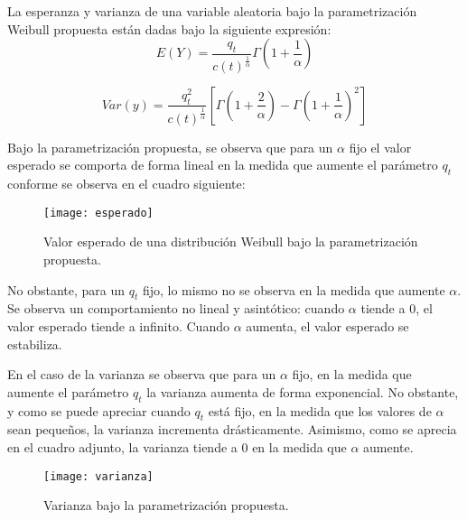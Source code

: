 La esperanza y varianza de una variable aleatoria bajo la parametrización Weibull propuesta están dadas bajo la siguiente expresión:
\begin{equation}
E(Y)=\frac{q_{t}}{c(t)^{\frac{1}{\alpha}}}\Gamma\left( 1+\frac{1}{\alpha} \right)
\end{equation}

\begin{equation}
Var(y)=\frac{q_{t}^{2}}{c(t)^{\frac{1}{\alpha}}}\left[ \Gamma\left( 1+\frac{2}{\alpha}\right)-\Gamma\left( 1+\frac{1}{\alpha} \right)^{2} \right]
\end{equation}

Bajo la parametrización propuesta, se observa que para un $\alpha$ fijo el valor esperado se comporta de forma lineal en la medida que aumente el parámetro $q_{t}$ conforme se observa en el cuadro siguiente:

\begin{figure}[H]
	\texttt{[image: esperado]}
	\caption{Valor esperado de una distribución Weibull bajo la parametrización propuesta.}
\end{figure}
\noindent No obstante, para un $q_{t}$ fijo, lo mismo no se observa en la medida que aumente $\alpha$. Se observa un comportamiento no lineal y asintótico: cuando $\alpha$ tiende a 0, el valor esperado tiende a infinito. Cuando $\alpha$ aumenta, el valor esperado se estabiliza.

En el caso de la varianza se observa que para un $\alpha$ fijo, en la medida que aumente el parámetro $q_{t}$ la varianza aumenta de forma exponencial. No obstante, y como se puede apreciar cuando $q_{t}$ está fijo, en la medida que los valores de $\alpha$ sean pequeños, la varianza incrementa drásticamente. Asimismo, como se aprecia en el cuadro adjunto, la varianza tiende a 0 en la medida que $\alpha$ aumente.

\begin{figure}[H]
	\texttt{[image: varianza]}
	\caption{Varianza bajo la parametrización propuesta.}
\end{figure}
